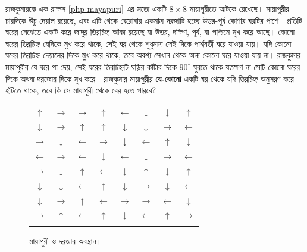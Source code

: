 \begin{example}
	রাজকুমারকে এক রাক্ষস \autoref{php-mayapuri}-এর মতো একটি $8\times8$ মায়াপুরীতে আটকে রেখেছে। মায়াপুরীর চারদিকে উঁচু দেয়াল রয়েছে, এবং এটি থেকে বেরোবার একমাত্র দরজাটি হচ্ছে উত্তর-পূর্ব কোণার ঘরটির পাশে। প্রতিটি ঘরের মেঝেতে একটি করে জাদুর তিরচিহ্ন আঁকা রয়েছে যা উত্তর, দক্ষিণ, পূর্ব, বা পশ্চিমে মুখ করে আছে। কোনো ঘরের তিরচিহ্ন যেদিকে মুখ করে থাকে, সেই ঘর থেকে শুধুমাত্র সেই দিকে পার্শ্ববর্তী ঘরে যাওয়া যায়। যদি কোনো ঘরের তিরচিহ্ন দেয়ালের দিকে মুখ করে থাকে, তবে অবশ্য সেখান থেকে অন্য কোনো ঘরে যাওয়া যায় না। রাজকুমার মায়াপুরীর যে ঘরে পা দেয়, সেই ঘরের তিরচিহ্নটি ঘড়ির কাঁটার দিকে $90^\circ$ ঘুরতে থাকে যতক্ষণ না সেটি কোনো ঘরের দিকে অথবা দরজাের দিকে মুখ করে। রাজকুমার মায়াপুরীর \textbf{যে-কোনো} একটি ঘর থেকে যদি তিরচিহ্ন অনুসরণ করে হাঁটতে থাকে, তবে কি সে মায়াপুরী থেকে বের হতে পারবে?
\end{example}
\begin{figure}[h]
\centering
\bgroup
\def\arraystretch{1.6}
\begin{tabular}{||c|c|c|c|c|c|c|c||}
\hhline{|t:========:t|}
$\uparrow$& $\rightarrow$ & $\rightarrow$&$\uparrow$& $\leftarrow$& $\downarrow$&$\downarrow$ & \multicolumn{1}{c}{$\uparrow$} \\
\hhline{||--------||}
$\downarrow$  & $\rightarrow$ & $\uparrow$    & $\uparrow$    & $\downarrow$  & $\downarrow$  & $\rightarrow$ & $\leftarrow$\\
\hhline{||--------||}
$\rightarrow$ & $\downarrow$  & $\leftarrow$  & $\rightarrow$ & $\downarrow$  & $\leftarrow$  & $\uparrow$    & $\downarrow$ \\
\hhline{||--------||}
$\leftarrow$  & $\rightarrow$ & $\leftarrow$  & $\downarrow$  & $\leftarrow$  & $\downarrow$  & $\rightarrow$ & $\leftarrow$ \\
\hhline{||--------||}
$\rightarrow$ & $\downarrow$  & $\uparrow$    & $\leftarrow$  & $\downarrow$  & $\uparrow$    & $\downarrow$  & $\uparrow$ \\
\hhline{||--------||}
$\downarrow$  & $\downarrow$  & $\leftarrow$  & $\uparrow$    & $\downarrow$  & $\rightarrow$ & $\downarrow$  & $\leftarrow$ \\
\hhline{||--------||}
$\downarrow$  & $\rightarrow$ & $\uparrow$    & $\leftarrow$  & $\rightarrow$ & $\rightarrow$ & $\leftarrow$  & $\downarrow$  \\
\hhline{||--------||}
$\rightarrow$ & $\uparrow$    & $\leftarrow$  & $\uparrow$    & $\downarrow$  & $\leftarrow$  & $\uparrow$    & $\rightarrow$\\
\hhline{|b:========:b|}
\end{tabular}
\egroup
\caption{মায়াপুরী ও দরজার অবস্থান।}
\label{php-mayapuri}
\end{figure}
